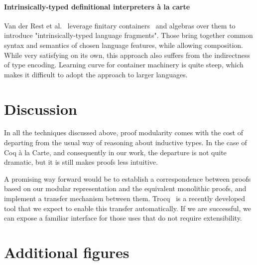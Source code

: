 \documentclass[sigplan,nonacm,review]{acmart}
\begin{document}
\paragraph{Intrinsically-typed definitional interpreters {\`a} la carte}
Van der Rest et al.~\cite{van2022intrinsically} leverage finitary containers~\cite{altenkirch2015indexed} and algebras over them to introduce "intrinsically-typed language fragments".
Those bring together common syntax and semantics of chosen language features, while allowing composition. 
%
%
%
%
While very satisfying on its own, this approach also suffers from the indirectness of type encoding. Learning curve for container machinery is quite steep, which makes it difficult to adopt the approach to larger languages.


\section{Discussion}

In all the techniques discussed above, proof modularity comes with the cost of departing from the usual way of reasoning about inductive types. In the case of Coq à la Carte, and consequently in our work, the departure is not quite dramatic, but it is still makes proofs less intuitive.

A promising way forward would be to establish a correspondence between proofs based on our modular representation and the equivalent monolithic proofs, and implement a transfer mechanism between them. Trocq~\cite{cohen2024trocq} is a recently developed tool that we expect to enable this transfer automatically. If we are successful, we can expose a familiar interface for those uses that do not require extensibility.





\appendix

\section{Additional figures}
\label{sec:additional-figures}
\end{document}
